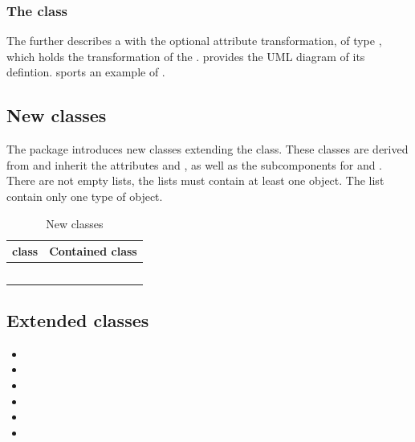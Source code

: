 \subsubsection{The  class}
\label{unittransformation-class}
The \UnitTransformation further describes a \UnitDefinition with the optional
attribute transformation, of type , which holds the
transformation of the \UnitDefinition.  provides the
UML diagram of its defintion.  sports an example of
\UnitTransformation.

\subsection{New \ListOf classes}
The \Pmf package introduces new classes extending the \ListOf class. These
classes are derived from \SBase and inherit the attributes  and
, as well as the subcomponents for \Annotation and \Notes. There
are not empty lists, the lists must contain at least one object. The list
contain only one type of object.

\begin{table}
	\begin{tabular}{|l|l|}
		\hline
		\textbf{\ListOf class} & \textbf{Contained class}\\
		\hline
		\ListOfCorrelations & \Correlation\\
		\ListOfDataSources & \DataSource\\
		\ListOfModelVariables & \ModelVariable\\
		\ListOfPrimaryModels & \PrimaryModel\\
		\ListOfReferences & \Reference\\
		\hline
	\end{tabular}
	\caption{New \ListOf classes}
	\label{listof-classes}
\end{table}


\subsection{Extended classes}
\begin{itemize}
	\item \Compartment
	\item \Model
	\item \Parameter
	\item \Rule
	\item \Species
	\item \UnitDefinition
\end{itemize}

